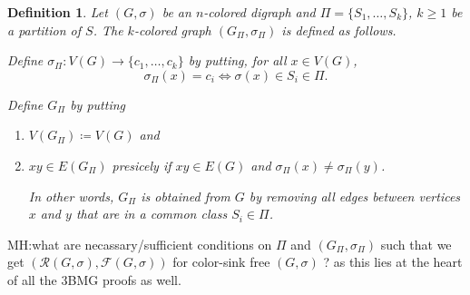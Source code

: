 \documentclass[final,3p,times]{elsarticle}
\newtheorem{definition}{Definition}[section]
\newcommand{\TODO}[1]{\begingroup\color{red}#1\endgroup}
\begin{document}
%	


	
	
\begin{definition}
	Let $(G,\sigma)$ be an $n$-colored digraph and $\Pi = \{S_1,\dots,S_k\}$, $k\geq 1$
	be a partition of $S$. The $k$-colored graph $(G_{\Pi},\sigma_{\Pi})$ is defined as follows. 
	
	
	Define $\sigma_{\Pi}\colon V(G) \to \{c_1,\dots,c_k\}$ by putting, for all $x\in V(G)$, 
    \[\sigma_{\Pi}(x)=c_i \iff \sigma(x)\in S_i\in \Pi.\] 
    
    Define  $G_{\Pi}$ by putting
	\begin{enumerate}
    	\item $V(G_{\Pi}) \coloneqq V(G)$ and
    
    \item $xy\in E(G_{\Pi})$  presicely if $xy\in E(G)$ and 
    	  $\sigma_{\Pi}(x)\neq \sigma_{\Pi}(y)$. 
    	  
    	  In other words,  $G_{\Pi}$ 
    	  is obtained from $G$ by removing all
    	  edges between vertices $x$ and $y$ that are 
    	  in a common class $S_i\in \Pi$. 
\end{enumerate}
\end{definition}	
	
	



\TODO{MH:what are necassary/sufficient conditions on $\Pi$ and $(G_{\Pi},\sigma_{\Pi})$
such that we get $(\mathscr{R}(G,\sigma),\mathscr{F}(G,\sigma))$ for color-sink free $(G,\sigma)$
? as this lies at the heart of all the 3BMG proofs as well. }



















\end{document}
